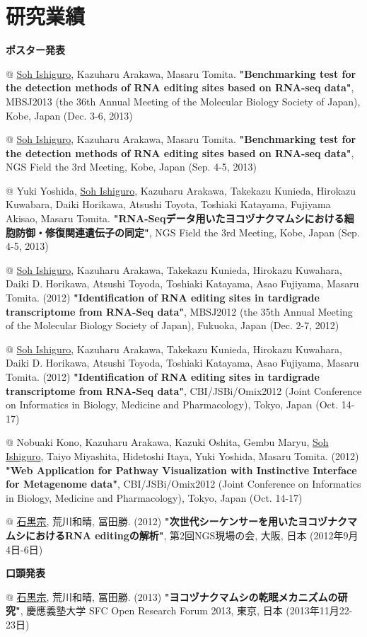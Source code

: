 \chapter*{研究業績}
\textbf{ポスター発表}
\begin{easylist}[itemize]
@ \underline{Soh Ishiguro}, Kazuharu Arakawa, Masaru Tomita. \textbf{"Benchmarking test for the detection methods of RNA editing sites based on RNA-seq data"}, MBSJ2013 (the 36th Annual Meeting of the Molecular Biology Society of Japan), Kobe, Japan (Dec. 3-6, 2013)

@ \underline{Soh Ishiguro}, Kazuharu Arakawa, Masaru Tomita. \textbf{"Benchmarking test for the detection methods of RNA editing sites based on RNA-seq data"}, NGS Field the 3rd Meeting, Kobe, Japan (Sep. 4-5, 2013)

@ Yuki Yoshida, \underline{Soh Ishiguro}, Kazuharu Arakawa, Takekazu Kunieda, Hirokazu Kuwabara, Daiki Horikawa, Atsushi Toyota, Toshiaki Katayama, Fujiyama Akisao, Masaru Tomita. \textbf{"RNA-Seqデータ用いたヨコヅナクマムシにおける細胞防御・修復関連遺伝子の同定"}, NGS Field the 3rd Meeting, Kobe, Japan (Sep. 4-5, 2013)

@ \underline{Soh Ishiguro}, Kazuharu Arakawa, Takekazu Kunieda, Hirokazu Kuwahara, Daiki D. Horikawa, Atsushi Toyoda, Toshiaki Katayama, Asao Fujiyama, Masaru Tomita. (2012) \textbf{"Identification of RNA editing sites in tardigrade transcriptome from RNA-Seq data"}, MBSJ2012 (the 35th Annual Meeting of the Molecular Biology Society of Japan), Fukuoka, Japan (Dec. 2-7, 2012)

@ \underline{Soh Ishiguro}, Kazuharu Arakawa, Takekazu Kunieda, Hirokazu Kuwahara, Daiki D. Horikawa, Atsushi Toyoda, Toshiaki Katayama, Asao Fujiyama, Masaru Tomita. (2012) \textbf{"Identification of RNA editing sites in tardigrade transcriptome from RNA-Seq data"}, CBI/JSBi/Omix2012 (Joint Conference on Informatics in Biology, Medicine and Pharmacology), Tokyo, Japan (Oct. 14-17)

@ Nobuaki Kono, Kazuharu Arakawa, Kazuki Oshita, Gembu Maryu, \underline{Soh Ishiguro}, Taiyo Miyashita, Hidetoshi Itaya, Yuki Yoshida, Masaru Tomita. (2012) \textbf{"Web Application for Pathway Visualization with Instinctive Interface for Metagenome data"}, CBI/JSBi/Omix2012 (Joint Conference on Informatics in Biology, Medicine and Pharmacology), Tokyo, Japan (Oct. 14-17)

@ \underline{石黒宗}, 荒川和晴, 冨田勝. (2012) \textbf{"次世代シーケンサーを用いたヨコヅナクマムシにおけるRNA editingの解析"}, 第2回NGS現場の会, 大阪, 日本 (2012年9月4日-6日)
\end{easylist}


\textbf{口頭発表}
\begin{easylist}[itemize]
@ \underline{石黒宗}, 荒川和晴, 冨田勝. (2013) \textbf{"ヨコヅナクマムシの乾眠メカニズムの研究"}, 慶應義塾大学 SFC Open Research Forum 2013, 東京, 日本 (2013年11月22-23日)
\end{easylist}